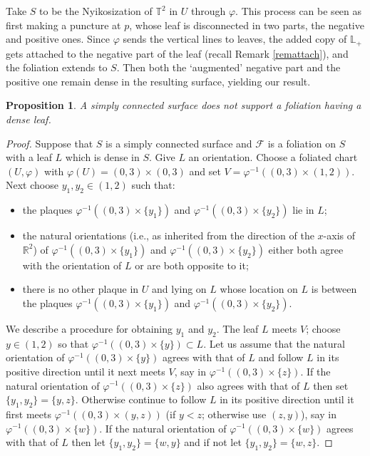 \documentclass{amsart}
\newtheorem{prop}[theorem]{Proposition}
\begin{document}
Take $S$ to be the Nyikosization of ${\mathbb T}^2$ in $U$ through $\varphi$. This process can be seen as first making a puncture at $p$, whose leaf is disconnected in two parts, the negative and positive ones. Since $\varphi$ sends the vertical lines to leaves, the added copy of ${\mathbb{L}}_+$ gets attached to the negative part of the leaf (recall Remark \ref{remattach}), and the foliation extends to $S$. Then both the `augmented' negative part and the positive one remain dense in the resulting surface, yielding our result.

\begin{prop} A simply connected surface does not support a foliation having a dense leaf.
\end{prop}
\begin{proof}
Suppose that $S$ is a simply connected surface and $\mathcal F$ is a foliation on $S$ with a leaf $L$ which is dense in $S$. Give $L$ an orientation. Choose a foliated chart $(U,\varphi)$ with $\varphi(U)=(0,3)\times(0,3)$ and set $V=\varphi^{-1}((0,3)\times(1,2))$. Next choose $y_1,y_2\in(1,2)$ such that:
\begin{itemize}
\item the plaques $\varphi^{-1}((0,3)\times\{y_1\})$ and  $\varphi^{-1}((0,3)\times\{y_2\})$ lie in $L$;
\item the natural orientations (i.e., as inherited from the direction of the $x$-axis of ${\mathbb R}^2$) of $\varphi^{-1}((0,3)\times\{y_1\})$ and  $\varphi^{-1}((0,3)\times\{y_2\})$ either both agree with the orientation of $L$ or are both opposite to it;
\item there is no other plaque in $U$ and lying on $L$ whose location on $L$ is between the plaques $\varphi^{-1}((0,3)\times\{y_1\})$ and $\varphi^{-1}((0,3)\times\{y_2\})$.
\end{itemize}
We describe a procedure for obtaining $y_1$ and $y_2$. The leaf $L$ meets $V$; choose $y\in(1,2)$ so that $\varphi^{-1}((0,3)\times\{y\})\subset L$. Let us assume that the natural orientation of $\varphi^{-1}((0,3)\times\{y\})$ agrees with that of $L$ and follow $L$ in its positive direction until it next meets $V$, say in $\varphi^{-1}((0,3)\times\{z\})$. If the natural orientation of $\varphi^{-1}((0,3)\times\{z\})$ also agrees with that of $L$ then set $\{y_1,y_2\}=\{y,z\}$. Otherwise continue to follow $L$ in its positive direction until it first meets $\varphi^{-1}((0,3)\times(y,z))$ (if $y<z$; otherwise use $(z,y)$), say in $\varphi^{-1}((0,3)\times\{w\})$. If the natural orientation of $\varphi^{-1}((0,3)\times\{w\})$ agrees with that of $L$ then let $\{y_1,y_2\}=\{w,y\}$ and if not let $\{y_1,y_2\}=\{w,z\}$.


\end{proof}
\end{document}

